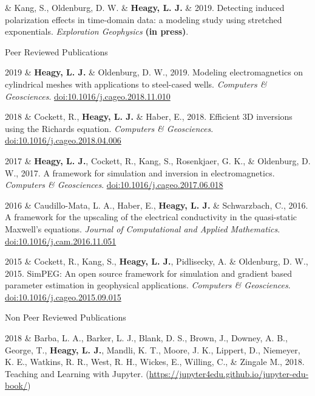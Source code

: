 \documentclass[a4paper, 11pt]{article}
\newcommand{\doi}[1]{\href{https://doi.org/#1}{doi:#1}}
\newcommand{\subheading}[1]{
    \vspace{0.4cm}
    {\Large #1}\\
    \vspace{-0.2cm}
}
\begin{document}
\begin{entryright}
& Kang, S., Oldenburg, D. W. \& \textbf{Heagy, L. J.} \& 2019. Detecting induced polarization effects in time-domain data: a modeling study using stretched exponentials. \emph{Exploration Geophysics} \textbf{(in press)}.
\end{entryright}


\subheading{Peer Reviewed Publications}

\begin{entryright}
2019 & \textbf{Heagy, L. J.} \& Oldenburg, D. W., 2019. Modeling electromagnetics on cylindrical meshes with applications to steel-cased wells. \emph{Computers \& Geosciences}. \doi{10.1016/j.cageo.2018.11.010}
\end{entryright}

\begin{entryright}
2018 & Cockett, R., \textbf{Heagy, L. J.} \& Haber, E., 2018. Efficient 3D inversions using the Richards equation. \emph{Computers \& Geosciences}. \doi{10.1016/j.cageo.2018.04.006}
\end{entryright}

\begin{entryright}
2017 & \textbf{Heagy, L. J.}, Cockett, R., Kang, S., Rosenkjaer, G. K., \& Oldenburg, D. W., 2017. A framework for simulation and inversion in electromagnetics. \emph{Computers \& Geosciences}. \doi{10.1016/j.cageo.2017.06.018}
\end{entryright}

\begin{entryright}
2016 & Caudillo-Mata, L. A., Haber, E., \textbf{Heagy, L. J.} \& Schwarzbach, C., 2016. A framework for the upscaling of the electrical conductivity in the quasi-static Maxwell’s equations. \emph{Journal of Computational and Applied Mathematics}. \doi{10.1016/j.cam.2016.11.051}
\end{entryright}

\begin{entryright}
2015 & Cockett, R., Kang, S., \textbf{Heagy, L. J.}, Pidlisecky, A. \& Oldenburg, D. W., 2015. SimPEG: An open source framework for simulation and gradient based parameter estimation in geophysical applications. \emph{Computers \& Geosciences}. \doi{10.1016/j.cageo.2015.09.015}
\end{entryright}


\subheading{Non Peer Reviewed Publications}

\begin{entryright}
2018 & Barba, L. A., Barker, L. J., Blank, D. S., Brown, J., Downey, A. B., George, T., \textbf{Heagy, L. J.},  Mandli, K. T., Moore, J. K., Lippert, D.,  Niemeyer, K. E., Watkins, R. R., West, R. H., Wickes, E., Willing, C., \& Zingale M., 2018. Teaching and Learning with Jupyter. (\href{https://jupyter4edu.github.io/jupyter-edu-book/}{https://jupyter4edu.github.io/jupyter-edu-book/})
\end{entryright}
\end{document}
